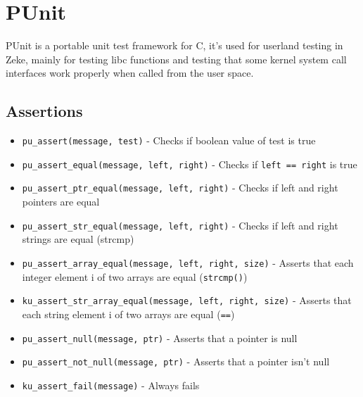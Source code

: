 \chapter{PUnit}

PUnit is a portable unit test framework for C, it's used for userland testing
in Zeke, mainly for testing libc functions and testing that some kernel
system call interfaces work properly when called from the user space.

\section{Assertions}

\begin{itemize}
\item \verb+pu_assert(message, test)+ - Checks if boolean value of test is true
\item \verb+pu_assert_equal(message, left, right)+ - Checks if
      \verb+left == right+ is true
\item \verb+pu_assert_ptr_equal(message, left, right)+ - Checks if left and
      right pointers are equal
\item \verb+pu_assert_str_equal(message, left, right)+ - Checks if left and
      right strings are equal (strcmp)
\item \verb+pu_assert_array_equal(message, left, right, size)+ - Asserts that
      each integer element i of two arrays are equal (\verb+strcmp()+)
\item \verb+ku_assert_str_array_equal(message, left, right, size)+ - Asserts
      that each string element i of two arrays are equal (\verb+==+)
\item \verb+pu_assert_null(message, ptr)+ - Asserts that a pointer is null
\item \verb+pu_assert_not_null(message, ptr)+ - Asserts that a pointer isn't
      null
\item \verb+ku_assert_fail(message)+ - Always fails
\end{itemize}
